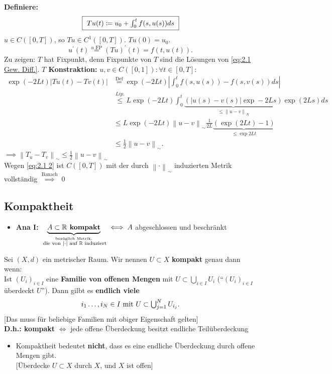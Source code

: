 \textbf{Definiere:}
\[
	$ \fbox{ $
		T u(t) \coloneqq u_0 + \int_{0}^{t} f(s, u(s)) ds
	$ } $
\]
$ u \in C([0, T]) $, so $ T u \in C^1([0, T]) $. $ T u(0) = u_0 $.
\[
	u^\prime (t) \overset{u \text{ FP} }{=} (Tu)^\prime (t) = f(t, u(t)).
\]
Zu zeigen: $ T $ hat Fixpunkt, denn Fixpunkte von $ T $ sind die Lösungen von \ref{eq:2.1 Gew. Diff.}.
\textbf{$ T $ Konstraktion:} $ u, v \in C([0, 1]) : \forall t \in [0, T] : $
\begin{align*}
	\exp (-2Lt) \left| Tu(t) - Tv(t) \right| &\overset{\text{Def} }{=} \exp (-2Lt) \left| \int_{0}^{t}f(s, u(s)) - f(s, v(s)) ds \right| \\
	~ & \overset{Lip.}{\leq } L \exp (-2Lt) \int_{0}^{t} \underbrace{\left( \left| u(s) - v(s) \right| \exp -2Ls \right) }_{\leq \left\| u - v \right\| _{N} } \exp (2Ls) ds \\
	  & \leq  L \exp (-2Lt) \left\| u - v \right\| _{\sim} \frac{ 1 }{ 2L } \underbrace{\left( \exp (2Lt) - 1 \right) }_{\leq \exp 2Lt} \\
	  &\leq \frac{ 1 }{ 2 } \left\| u - v \right\| _{\sim} .
\end{align*}
$ \implies \left\| T_u - T_v \right\| _{\sim} \leq \frac{ 1 }{ 2 } \left\| u - v \right\| _{\sim}  $\\
Wegen \ref{eq:2.1 2} ist $ C([0, T]) $ mit der durch $ \left\| \cdot  \right\| _{\sim}  $ induzierten Metrik vollständig $ \overset{\text{Banach} }{\implies } $\qed

\subsection{Kompaktheit}

\begin{itemize}
	\item \textbf{Ana I:} $ \underbrace{A \subset \mathbb{R}   \text{\textbf{ kompakt}}}_{\overset{\text{bezüglich Metrik,}}{\text{ die von $ \left| \cdot  \right| $ auf $ \mathbb{R}  $ induziert}} }  \iff  A $ abgeschlossen und beschränkt
\end{itemize}


\begin{subdefinition}[Kompaktheit]
	Sei $ (X, d) $ ein metrischer Raum. Wir nennen $ U \subset  X $ \textbf{kompakt} genau dann wenn:\\
	Ist $ (U_i)_{i \in I}  $ eine \textbf{Familie von offenen Mengen} mit $ U \subset \bigcup_{i \in  I}  U_i $ (``$ (U_i)_{i \in I}  $ überdeckt $ U $'').
	Dann gilbt es \textbf{endlich viele}
	\[ i_1 \dotsc, i_N \in I $ mit $ U \subset \bigcup_{j = 1} ^N U_{i_j} . \]
	{\color{gadse-red}[Das muss für beliebige Familien mit obiger Eigenschaft gelten]}\\
	\textbf{D.h.: kompakt} $ \iff  $ jede offene Überdeckung besitzt endliche Teilüberdeckung
	\begin{itemize}
		\item Kompaktheit bedeutet \textbf{nicht}, dass es eine endliche Überdeckung durch offene Mengen gibt.\\
			{[Überdecke $ U \subset X $ durch $ X $, und $ X $ ist offen]}
	\end{itemize}
\end{subdefinition}

